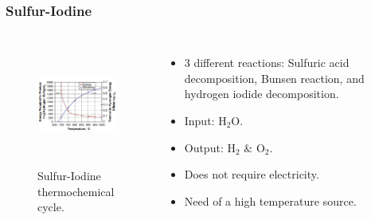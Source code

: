 \begin{frame}
\frametitle{Sulfur-Iodine}
\begin{columns}
    \column[t]{5cm}
   	\begin{figure}[htbp!]
		\begin{center}
			\includegraphics[height=4.0cm]{images/si-energy.png}
		\end{center}
		\caption{Sulfur-Iodine thermochemical cycle.}
 	\end{figure}

 	\column[t]{5cm}
 	\begin{itemize}
 		\item 3 different reactions: Sulfuric acid decomposition, Bunsen reaction, and hydrogen iodide decomposition.
 		\item Input: H$_2$O.
 		\item Output: H$_2$ $\&$ O$_2$. 
 		\item Does not require electricity.
 		\item Need of a high temperature source.
 	\end{itemize}
\end{columns}
\end{frame}

